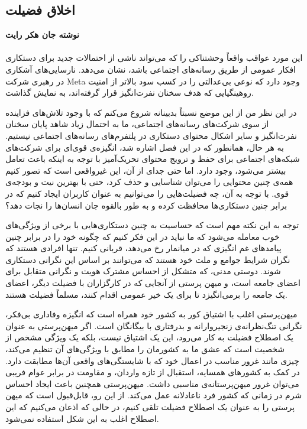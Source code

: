 {
\subsection*{اخلاق فضیلت}
\label{subsec:اخلاق فضیلت}
\noindent \textbf{نوشته جان هکر رایت}
\\\\
این مورد عواقب واقعاً وحشتناکی را که می‌تواند ناشی از احتمالات جدید برای دستکاری افکار عمومی از طریق رسانه‌های اجتماعی باشد، نشان می‌دهد. نارسایی‌های آشکاری در رهبری شرکت Meta وجود دارد که نوعی بی‌عدالتی را در کسب سود بالاتر از امنیت روهینگیایی که هدف سخنان نفرت‌انگیز قرار گرفته‌اند، به نمایش گذاشت.
}
در این نظر من از این موضع نسبتاً بدبینانه شروع می‌کنم که با وجود تلاش‌های فزاینده از سوی شرکت‌های رسانه‌های اجتماعی، ما به احتمال زیاد شاهد پایان سخنان نفرت‌انگیز و سایر اشکال محتوای دستکاری در پلتفرم‌های رسانه‌های اجتماعی نیستیم.
به هر حال، همانطور که در این فصل اشاره شد، انگیزه‌ی قوی‌ای برای شرکت‌های شبکه‌های اجتماعی برای حفظ و ترویج محتوای تحریک‌آمیز با توجه به اینکه باعث تعامل بیشتر می‌شود، وجود دارد.
اما حتی جدای از آن، این غیرواقعی است که تصور کنیم همه‌ی چنین محتوایی را می‌توان شناسایی و حذف کرد، حتی با بهترین نیت و بودجه‌ی قوی.
با توجه به آن، چه فضیلت‌هایی را می‌توانیم به عنوان کاربران ایجاد کنیم که در برابر چنین دستکاری‌ها محافظت کرده و به طور بالقوه جان انسان‌ها را نجات دهد؟

توجه به این نکته مهم است که حساسیت به چنین دستکاری‌هایی با برخی از ویژگی‌های خوب معامله می‌شود که ما نباید در این فکر کنیم که چگونه خود را در برابر چنین پیامدهای غم انگیزی که در میانمار رخ می‌دهد، قربانی کنیم.
تنها افرادی هستند که نگران شرایط جوامع و ملت خود هستند که می‌توانند بر اساس این نگرانی دستکاری شوند.
دوستی مدنی، که متشکل از احساس مشترک هویت و نگرانی متقابل برای اعضای جامعه است، و میهن پرستی از آنجایی که در کارگزاران با فضیلت دیگر، اعضای یک جامعه را برمی‌انگیزد تا برای یک خیر عمومی اقدام کنند، مسلماً فضیلت هستند.

میهن‌پرستی اغلب با اشتیاق کور به کشور خود همراه است که انگیزه وفاداری بی‌فکر، نگرانی تنگ‌نظرانه‌ی زنجیروارانه و بدرفتاری با بیگانگان است.
اگر میهن‌پرستی به عنوان یک اصطلاح فضیلت به کار می‌رود، این یک اشتیاق نیست، بلکه یک ویژگی مشخص از شخصیت است که عشق ما به کشورمان را مطابق با ویژگی‌های آن تنظیم می‌کند، چیزی مانند غرور مناسب در اعمال خود که با شایستگی‌های واقعی آن‌ها مطابقت دارد.
در کمک به کشورهای همسایه، استقبال از تازه واردان، و مقاومت در برابر عوام فریبی می‌توان غرور میهن‌پرستانه‌ی مناسبی داشت.
میهن‌پرستی همچنین باعث ایجاد احساس شرم در زمانی که کشور فرد ناعادلانه عمل می‌کند.
از این رو، قابل‌قبول است که میهن پرستی را به عنوان یک اصطلاح فضیلت تلقی کنیم، در حالی که اذعان می‌کنیم که این اصطلاح اغلب به این شکل استفاده نمی‌شود.

